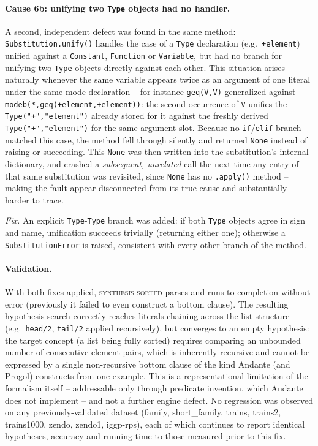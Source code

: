 \paragraph{Cause 6b: unifying two \texttt{Type} objects had no
handler.} A second, independent defect was found in the same method:
\texttt{Substitution.unify()} handles the case of a \texttt{Type}
declaration (e.g.\ \texttt{+element}) unified against a
\texttt{Constant}, \texttt{Function} or \texttt{Variable}, but had no
branch for unifying two \texttt{Type} objects directly against each
other. This situation arises naturally whenever the same variable
appears twice as an argument of one literal under the same mode
declaration -- for instance \texttt{geq(V,V)} generalized against
\texttt{modeb(*,geq(+element,+element))}: the second occurrence of
\texttt{V} unifies the \texttt{Type("+","element")} already stored for
it against the freshly derived \texttt{Type("+","element")} for the same
argument slot. Because no \texttt{if}/\texttt{elif} branch matched this
case, the method fell through silently and returned \texttt{None}
instead of raising or succeeding. This \texttt{None} was then written
into the substitution's internal dictionary, and crashed a
\emph{subsequent, unrelated} call the next time any entry of that same
substitution was revisited, since \texttt{None} has no \texttt{.apply()}
method -- making the fault appear disconnected from its true cause and
substantially harder to trace.

\emph{Fix.} An explicit \texttt{Type}-\texttt{Type} branch was added:
if both \texttt{Type} objects agree in sign and name, unification
succeeds trivially (returning either one); otherwise a
\texttt{SubstitutionError} is raised, consistent with every other
branch of the method.

\paragraph{Validation.} With both fixes applied, \textsc{synthesis-sorted}
parses and runs to completion without error (previously it failed to
even construct a bottom clause). The resulting hypothesis search
correctly reaches literals chaining across the list structure (e.g.\
\texttt{head/2}, \texttt{tail/2} applied recursively), but converges to
an empty hypothesis: the target concept (a list being fully sorted)
requires comparing an unbounded number of consecutive element pairs,
which is inherently recursive and cannot be expressed by a single
non-recursive bottom clause of the kind Andante (and Progol) constructs
from one example. This is a representational limitation of the
formalism itself -- addressable only through predicate invention, which
Andante does not implement -- and not a further engine defect. No
regression was observed on any previously-validated dataset (family,
short\_family, trains, trains2, trains1000, zendo, zendo1,
iggp-rps), each of which continues to report identical hypotheses,
accuracy and running time to those measured prior to this fix.

